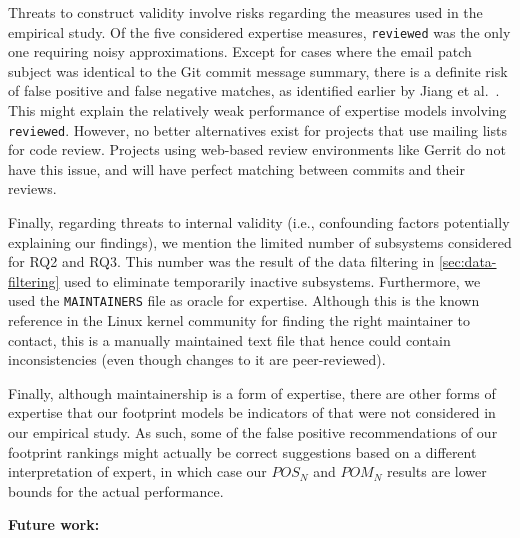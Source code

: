 Threats to construct validity involve risks regarding the measures used in the empirical study. Of the five considered expertise measures, \texttt{reviewed} was the only one requiring noisy approximations. Except for cases where the email patch subject was identical to the Git commit message summary, there is a definite risk of false positive and false negative matches, as identified earlier by Jiang et al.~\citep{msr13jojo,jiang14}. This might explain the relatively weak performance of expertise models involving \texttt{reviewed}. However, no better alternatives exist for projects that use mailing lists for code review. Projects using web-based review environments like Gerrit do not have this issue, and will have perfect matching between commits and their reviews.

Finally, regarding threats to internal validity (i.e., confounding factors potentially explaining our findings), we mention the limited number of subsystems considered for RQ2 and RQ3. This number was the result of the data filtering in \autoref{sec:data-filtering} used to eliminate temporarily inactive subsystems. Furthermore, we used the \texttt{MAINTAINERS} file as oracle for expertise. Although this is the known reference in the Linux kernel community for finding the right maintainer to contact, this is a manually maintained text file that hence could contain inconsistencies (even though changes to it are peer-reviewed).

Finally, although maintainership is a form of expertise, there are other forms of expertise that our footprint models be indicators of that were not considered in our empirical study. As such, some of the false positive recommendations of our footprint rankings might actually be correct suggestions based on a different interpretation of expert, in which case our $POS_N$ and $POM_N$ results are lower bounds for the actual performance.


\textbf{Future work:}

